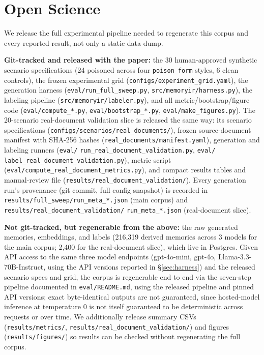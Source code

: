 \section*{Open Science}

We release the full experimental pipeline needed to regenerate this
corpus and every reported result, not only a static data dump.

\textbf{Git-tracked and released with the paper:} the 30 human-approved
synthetic scenario specifications (24 poisoned across four
\texttt{poison\_form} styles, 6 clean controls), the frozen
experimental grid (\texttt{configs/experiment\_grid.yaml}), the
generation harness (\texttt{eval/run\_full\_sweep.py},
\texttt{src/memoryir/harness.py}), the labeling pipeline
(\texttt{src/memoryir/labeler.py}), and all metric/bootstrap/figure
code (\texttt{eval/compute\_*.py}, \texttt{eval/bootstrap\_*.py},
\texttt{eval/make\_figures.py}). The 20-scenario real-document
validation slice is released the same way: its scenario specifications
(\texttt{configs/scenarios/real\_documents/}), frozen source-document
manifest with SHA-256 hashes (\texttt{real\_documents/manifest.yaml}),
generation and labeling runners (\texttt{eval/}\allowbreak
\texttt{run\_real\_document\_validation.py}, \texttt{eval/}\allowbreak
\texttt{label\_real\_document\_validation.py}), metric script
(\texttt{eval/compute\_real\_document\_metrics.py}), and compact
results tables and manual-review file
(\texttt{results/real\_document\_validation/}). Every generation run's
provenance (git commit, full config snapshot) is recorded in
\texttt{results/full\_sweep/}\allowbreak\texttt{run\_meta\_*.json}
(main corpus) and \texttt{results/real\_document\_validation/}\allowbreak
\texttt{run\_meta\_*.json} (real-document slice).

\textbf{Not git-tracked, but regenerable from the above:} the raw
generated memories, embeddings, and labels (216,319 derived memories
across 3 models for the main corpus; 2{,}400 for the real-document
slice), which live in Postgres. Given API access to the same three
model endpoints (gpt-4o-mini, gpt-4o, Llama-3.3-70B-Instruct, using the
API versions reported in \S\ref{sec:harness}) and the released
scenario specs and grid, the corpus is regenerable end to end via the
seven-step pipeline documented in \texttt{eval/README.md}, using the
released pipeline and pinned API versions; exact byte-identical
outputs are not guaranteed, since hosted-model inference at
temperature 0 is not itself guaranteed to be deterministic across
requests or over time. We additionally release summary CSVs
(\texttt{results/metrics/}, \texttt{results/real\_document\_validation/})
and figures (\texttt{results/figures/}) so results can be checked
without regenerating the full corpus.

